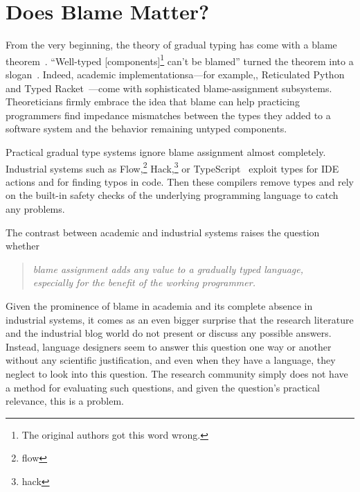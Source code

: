\section{Does Blame Matter?}

From the very beginning, the theory of gradual typing has come with a blame
theorem~\cite{mf-toplas-2009, tf-dls-2006}. ``Well-typed [components]\footnote{The
original authors got this word wrong.} can't be blamed'' turned the theorem into a
slogan~\cite{wf-esop-2009}. Indeed, academic implementationsa---for example,,
Reticulated Python~\cite{vsc-dls-2019, vss-popl-2017, vksb-dls-2014} and Typed
Racket~\cite{tf-dls-2006,tf-popl-2008,tfffgksst-snapl-2017,tf-icfp-2010}---come
with sophisticated blame-assignment subsystems. Theoreticians firmly embrace the
idea that blame can help practicing programmers find impedance mismatches between
the types they added to a software system and the behavior remaining untyped
components.

Practical gradual type systems ignore blame assignment almost completely.
Industrial systems such as Flow,\footnote{flow} Hack,\footnote{hack} or
TypeScript~\cite{ts} exploit types for IDE actions and for finding typos in
code. Then these compilers remove types and rely on the built-in safety checks of
the underlying programming language to catch any problems.

The contrast between academic and industrial systems raises the question whether
\begin{quote}
 \it
 blame assignment adds any value to a gradually typed language, \\
 especially for the benefit of the working programmer.
\end{quote}
Given the prominence of blame in academia and its complete absence in
industrial systems, it comes as an even bigger surprise that the research
literature and the industrial blog world do not present or discuss any possible
answers.  Instead, language designers seem to answer this question one way or
another without any scientific justification, and even when they have a language,
they neglect to look into this question. The research community simply does not
have a method for evaluating such questions, and given the question's practical
relevance, this is a problem.

